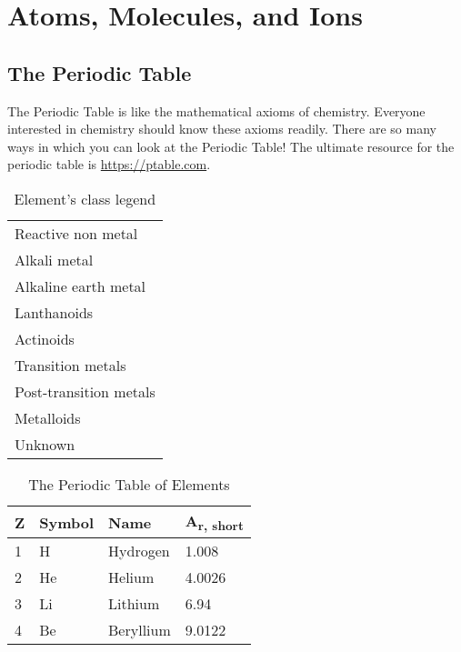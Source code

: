 \documentclass{article}
\begin{document}
\listoftodos
\section{Atoms, Molecules, and Ions}
\label{sec: a-m-i}
\subsection{The Periodic Table}
\label{sec: pt}
The Periodic Table is like the mathematical axioms of chemistry. Everyone interested in chemistry should know these axioms readily. There are so many ways in which you can look at the Periodic Table! The ultimate resource for the periodic table is \url{https://ptable.com}.
\begin{center}
            \begin{longtable}{l}
            \caption{Element's class legend} \label{tab: the-color-legend} \\
            \endfirsthead
            \endhead
            \cellcolor{rnmgreen}Reactive non metal\\ 
            \cellcolor{alkalibeige}Alkali metal\\ 
            \cellcolor{alkalineyellow}Alkaline earth metal\\ 
            \cellcolor{lanthorange}Lanthanoids\\ 
            \cellcolor{actipink}Actinoids\\ 
            \cellcolor{transred}Transition metals\\ 
            \cellcolor{postblue}Post-transition metals\\ 
            \cellcolor{metalloid}Metalloids\\ 
            \cellcolor{unk}Unknown\\ 
            \end{longtable}
\begin{longtable}{|l|l|l|l|}
\caption{The Periodic Table of Elements} \label{tab: the-ptable} \\
\hline
    Z & Symbol & Name & A\textsubscript{r, short}\\
\hline
\endfirsthead
\endhead
    1 & H & \cellcolor{rnmgreen}Hydrogen & 1.008\\
 \hline
    2 & He & \cellcolor{noblepink}Helium & 4.0026\\
 \hline
 \hline
    3 & Li & \cellcolor{alkalibeige}Lithium & 6.94\\
 \hline
    4 & Be & \cellcolor{alkalineyellow}Beryllium & 9.0122\\

\end{longtable}
\end{center}
\end{document}

